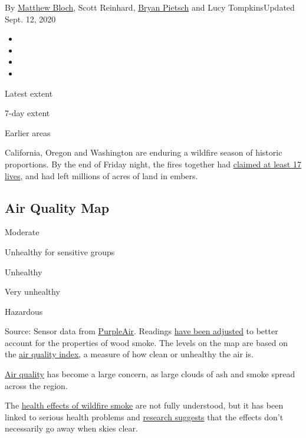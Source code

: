 By \href{https://www.nytimes3xbfgragh.onion/by/matthew-bloch}{Matthew
Bloch}, Scott Reinhard,
\href{https://www.nytimes3xbfgragh.onion/by/bryan-pietsch}{Bryan
Pietsch} and Lucy TompkinsUpdated Sept. 12, 2020

\begin{itemize}
\item
\item
\item
\item
\end{itemize}

Latest extent

7-day extent

Earlier areas

California, Oregon and Washington are enduring a wildfire season of
historic proportions. By the end of Friday night, the fires together had
\href{https://www.nytimes3xbfgragh.onion/2020/09/12/us/wildfire-deaths.html}{claimed
at least 17 lives}, and had left millions of acres of land in embers.

\hypertarget{air-quality-map}{%
\subsection{Air Quality Map}\label{air-quality-map}}

Moderate

Unhealthy for sensitive groups

Unhealthy

Very unhealthy

Hazardous

Source: Sensor data from \href{https://www2.purpleair.com}{PurpleAir}.
Readings
\href{https://www.mdpi.com/2073-4433/11/8/856/htm?fbclid=IwAR2MAjSqcn-5TvQZY5SP-kjfB1su2IO8Zlrl9XBtZQ-Dnv4jxnN6VbtZqGw}{have
been adjusted} to better account for the properties of wood smoke. The
levels on the map are based on the
\href{https://www3.epa.gov/airnow/aqi_brochure_02_14.pdf}{air quality
index}, a measure of how clean or unhealthy the air is.

\href{https://www.nytimes3xbfgragh.onion/2020/09/12/health/fires-air-california.html}{A}\href{https://www.nytimes3xbfgragh.onion/2020/09/12/health/fires-air-california.html}{ir
quality} has become a large concern, as large clouds of ash and smoke
spread across the region.

The
\href{https://www.nytimes3xbfgragh.onion/2020/09/12/us/wildfires-live-updates.html\#link-7a6a9ef4}{health
effects of wildfire smoke} are not fully understood, but it has been
linked to serious health problems and
\href{https://www.sciencedirect.com/science/article/pii/S0160412019326935}{research
suggests} that the effects don't necessarily go away when skies clear.

